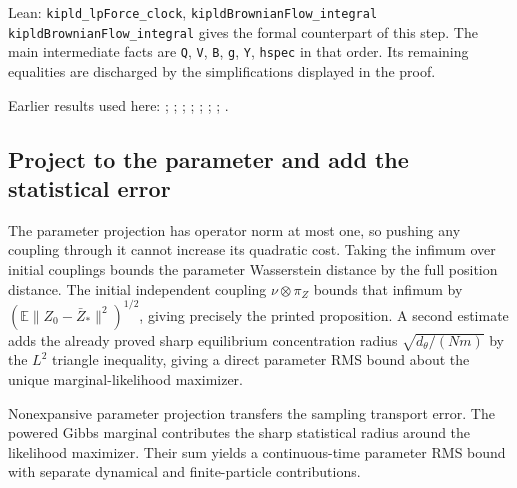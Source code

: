 \documentclass[11pt,a4paper]{report}
\begin{document}
\begin{leanbox}{Lean: \texttt{kipld\_\allowbreak{}lpForce\_\allowbreak{}clock}, \texttt{kipldBrownianFlow\_\allowbreak{}integral}}
\texttt{kipld\allowbreak{}Brownian\allowbreak{}Flow\_\allowbreak{}integral} gives the formal counterpart of this step. The main intermediate facts are \texttt{Q}, \texttt{V}, \texttt{B}, \texttt{g}, \texttt{Y}, \texttt{hspec} in that order. Its remaining equalities are discharged by the simplifications displayed in the proof.
\end{leanbox}


Earlier results used here: \cite[Section~3.13.2]{LangevinLean2026ULASC}; \cite[Section~3.13.3]{LangevinLean2026ULASC}; \cite[Section~3.13.5]{LangevinLean2026ULASC}; \cite[Section~3.1.1]{LangevinLean2026IPLA}; \cite[Section~3.1.4]{LangevinLean2026IPLA}; \cite[Section~3.1.1]{LangevinLean2026Kinetic}; \cite[Section~3.19.1]{LangevinLean2026Kinetic}; \cite[Section~3.33.1]{LangevinLean2026Kinetic}.
\subsection{\texorpdfstring{Project to the parameter and add the statistical error}{Project to the parameter and add the statistical error}}
\label{report-step-KIPLMC-Continuous-lean-5}


The parameter projection has operator norm at most one, so pushing any coupling through it cannot increase its quadratic cost. Taking the infimum over initial couplings bounds the parameter Wasserstein distance by the full position distance. The initial independent coupling \(\nu\otimes\pi_Z\) bounds that infimum by \((\mathbb E\|Z_0-\bar Z_*\|^2)^{1/2}\), giving precisely the printed proposition. A second estimate adds the already proved sharp equilibrium concentration radius \(\sqrt{d_\theta/(Nm)}\) by the \(L^{2}\) triangle inequality, giving a direct parameter RMS bound about the unique marginal-likelihood maximizer.



Nonexpansive parameter projection transfers the sampling transport error. The powered Gibbs marginal contributes the sharp statistical radius around the likelihood maximizer. Their sum yields a continuous-time parameter RMS bound with separate dynamical and finite-particle contributions.
\end{document}
